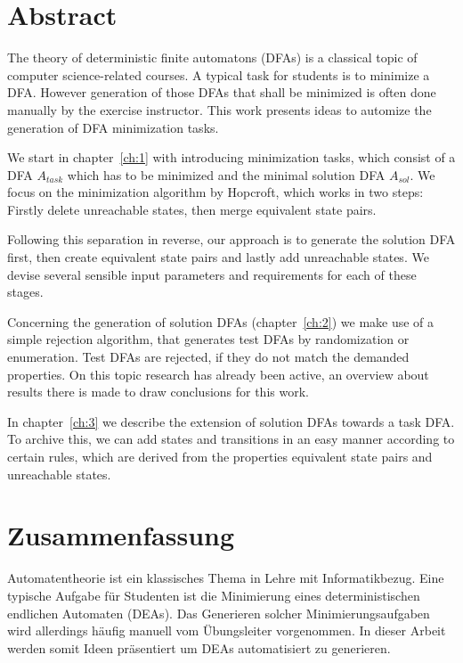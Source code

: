 
\chapter{Abstract}

The theory of deterministic finite automatons (DFAs) is a classical topic of computer science-related courses. A typical task for students is to minimize a DFA. However generation of those DFAs that shall be minimized is often done manually by the exercise instructor. This work presents ideas to automize the generation of DFA minimization tasks.

We start in chapter~\ref{ch:1} with introducing minimization tasks, which consist of a DFA $A_{task}$ which has to be minimized and the minimal solution DFA $A_{sol}$. We focus on the minimization algorithm by Hopcroft, which works in two steps: Firstly delete unreachable states, then merge equivalent state pairs.

Following this separation in reverse, our approach is to generate the solution DFA first, then create equivalent state pairs and lastly add unreachable states. We devise several sensible input parameters and requirements for each of these stages.

Concerning the generation of solution DFAs (chapter~\ref{ch:2}) we make use of a simple rejection algorithm, that generates test DFAs by randomization or enumeration. Test DFAs are rejected, if they do not match the demanded properties. On this topic research has already been active, an overview about results there is made to draw conclusions for this work.

In chapter~\ref{ch:3} we describe the extension of solution DFAs towards a task DFA. To archive this, we can add states and transitions in an easy manner according to certain rules, which are derived from the properties equivalent state pairs and unreachable states.



\chapter{Zusammenfassung}

Automatentheorie ist ein klassisches Thema in Lehre mit Informatikbezug. Eine typische Aufgabe für Studenten ist die Minimierung eines deterministischen endlichen Automaten (DEAs). Das Generieren solcher Minimierungsaufgaben wird allerdings häufig manuell vom Übungsleiter vorgenommen. In dieser Arbeit werden somit Ideen präsentiert um DEAs automatisiert zu generieren.

